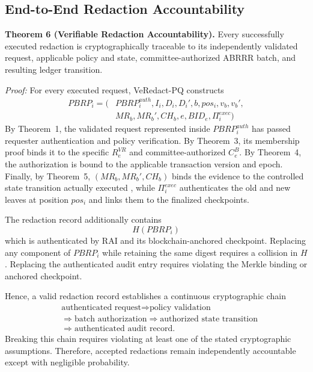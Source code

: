 \documentclass[lettersize,journal]{IEEEtran}
\begin{document}
    
    
    \subsection{End-to-End Redaction Accountability}
    
    \textbf{Theorem 6 (Verifiable Redaction Accountability).}
    Every successfully executed redaction is cryptographically traceable
    to its independently validated request, applicable policy and state,
    committee-authorized ABRRR batch, and resulting ledger transition.
    
    \emph{Proof:}
    For every executed request, VeRedact-PQ constructs
    \begin{equation}
    { 
    \begin{aligned}
    PBRP_i=\big(&PBRP_i^{auth},I_i,D_i,D_i',b,pos_i,v_b,v_b',\\
    &MR_b,MR_b',CH_b,e,BID_e,\Pi_i^{exec}\big)
    \end{aligned}}
    \label{eq:sec_pbrp}
    \end{equation}
    By Theorem~1, the validated request represented inside
    $PBRP_i^{auth}$ has passed requester authentication and policy
    verification. By Theorem~3, its membership proof binds it to the
    specific $R_e^{VR}$ and committee-authorized $C_e^B$. By
    Theorem~4, the authorization is bound to the applicable transaction
    version and epoch. Finally, by Theorem~5, $(MR_b,MR_b',CH_b)$ binds
    the evidence to the controlled state transition actually executed {,
    while $\Pi_i^{exec}$ authenticates the old and new leaves at position
    $pos_i$ and links them to the finalized checkpoints}.
    
    The redaction record additionally contains
    \begin{equation}
    H(PBRP_i)
    \label{eq:sec_pbrp_hash}
    \end{equation}
    which is authenticated by RAI and its blockchain-anchored checkpoint.
    Replacing any component of $PBRP_i$ while retaining the same digest
    requires a collision in $H$. Replacing the authenticated audit entry
    requires violating the Merkle binding or anchored checkpoint.
    
    Hence, a valid redaction record establishes a continuous
    cryptographic chain
    \begin{equation}
    \begin{split}
    &\text{authenticated request}
    \Rightarrow \text{policy validation}\\
    &\Rightarrow \text{batch authorization}
    \Rightarrow \text{authorized state transition}\\
    &\Rightarrow \text{authenticated audit record}.
    \end{split}
    \label{eq:sec_accountability_chain}
    \end{equation}
    Breaking this chain requires violating at least one of the stated
    cryptographic assumptions. Therefore, accepted redactions remain
    independently accountable except with negligible probability.
     
\end{document}
